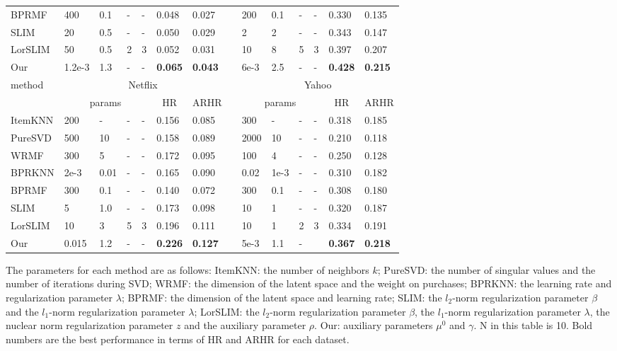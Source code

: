 \documentclass[letterpaper]{article}
\begin{document}
\begin{table}[ht]
\begin{center}
\begin{threeparttable}
\begin{tabular}{llllllllllllll}
BPRMF&400&0.1&-&-&0.048&0.027&&200&0.1&-&-&0.330&0.135\\
SLIM&20&0.5&-&-&0.050&0.029&&2&2&-&-&0.343&0.147\\
LorSLIM&50&0.5&2&3&0.052&0.031&&10&8&5&3&0.397&0.207\\
Our&1.2e-3&1.3&-&-&\bf{0.065}&\bf{0.043}&&6e-3&2.5&-&-&\bf{0.428}&\bf{0.215}\\
\hline\hline
\multirow{2}{*}{method} &
\multicolumn{6}{c}{Netflix} &
\multicolumn{1}{c}{}&
\multicolumn{6}{c}{Yahoo} \\
\cline{2-7} \cline{9-14} 
  & \multicolumn{4}{c}{params} &\multicolumn{1}{c}{HR}  & \multicolumn{1}{c}{ARHR} &\multicolumn{1}{c}{}&\multicolumn{4}{c}{params} &\multicolumn{1}{c}{HR}  & \multicolumn{1}{c}{ARHR} \\ 
\hline
ItemKNN&200&-&-&-&0.156&0.085&&300&-&-&-&0.318&0.185\\
PureSVD&500&10&-&-&0.158&0.089&&2000&10&-&-&0.210&0.118\\
WRMF&300&5&-&-&0.172&0.095&&100&4&-&-&0.250&0.128\\
BPRKNN&2e-3&0.01&-&-&0.165&0.090&&0.02&1e-3&-&-&0.310&0.182\\
BPRMF&300&0.1&-&-&0.140&0.072&&300&0.1&-&-&0.308&0.180\\
SLIM&5&1.0&-&-&0.173&0.098&&10&1&-&-&0.320&0.187\\
LorSLIM&10&3&5&3&0.196&0.111&&10&1&2&3&0.334&0.191\\
Our&0.015&1.2&-&-&\bf{0.226}&\bf{0.127}&&5e-3&1.1&-&&\bf{0.367}&\bf{0.218}\\
\hline
\end{tabular}%
%

   \begin{tablenotes}
      

      \item The parameters for each method are as follows: ItemKNN: the number of neighbors $k$; PureSVD: the number of singular values and the number of iterations during SVD; WRMF: the dimension of the latent space and the weight on purchases; BPRKNN: the learning rate and regularization parameter $\lambda$; BPRMF: the dimension of the latent space and learning rate; SLIM: the $l_2$-norm regularization parameter $\beta$ and the $l_1$-norm regularization parameter
$\lambda$; LorSLIM: the $l_2$-norm regularization parameter $\beta$, the $l_1$-norm regularization parameter $\lambda$, the nuclear norm regularization parameter $z$ and the auxiliary parameter $\rho$. Our: auxiliary parameters $\mu^0$ and $\gamma$. N in this table is 10. Bold numbers are the best performance in terms of HR and ARHR for each dataset. 

 \end{tablenotes}
\end{threeparttable}
\end{center}
\end{table}
\end{document}
